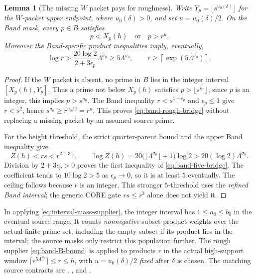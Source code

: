 \documentclass[11pt]{article}
\newcommand{\Lam}{\Lambda}
\newcommand{\epsp}{\epsilon_p}
\newtheorem{lemma}[theorem]{Lemma}
\theoremstyle{definition}
\theoremstyle{remark}
\newcommand{\1}{\mathbf 1}
\begin{document}
\begin{lemma}[The missing $W$ packet pays for roughness]
\label{lem:band-rough-transport}
Write $Y_p=\lfloor s^{u_0(\delta)}\rfloor$ for the $W$-packet upper endpoint,
where $u_0(\delta)>0$, and set $u=u_0(\delta)/2$.
On the Band mask, every $p\in B$ satisfies
\begin{equation}\label{eq:band-rough-bridge}
 p<X_p(h)\quad\text{or}\quad p>r^u.
\end{equation}
Moreover the Band-specific product inequalities imply, eventually,
\begin{equation}\label{eq:band-five-bridge}
 \log r>\frac{20\log2}{2+3\epsp}\Lam^{\sigma_0}
    \ge5\Lam^{\sigma_0},\qquad
 r\ge\left\lceil\exp(5\Lam^{\sigma_0})\right\rceil.
\end{equation}
\end{lemma}
\begin{proof}
If the $W$ packet is absent, no prime in $B$ lies in the integer
interval $[X_p(h),Y_p]$. Thus a prime not below $X_p(h)$ satisfies
$p>\lfloor s^{u_0}\rfloor$; since $p$ is an integer, this implies
$p>s^{u_0}$. The Band inequality $r<s^{1+\epsp}$ and
$\epsp\le1$ give $r<s^2$, hence
$s^{u_0}\ge r^{u_0/2}=r^u$. This proves
\eqref{eq:band-rough-bridge} without replacing a missing packet by
an assumed source prime.

For the height threshold, the strict quarter-parent bound and the
upper Band inequality give
\[
 Z(h)<rs<r^{2+3\epsp},\qquad
 \log Z(h)=20\bigl(\lfloor\Lam^{\sigma_0}\rfloor+1\bigr)\log2
    >20(\log2)\Lam^{\sigma_0}.
\]
Division by $2+3\epsp>0$ proves the first inequality of
\eqref{eq:band-five-bridge}. The coefficient tends to
$10\log2>5$ as $\epsp\to0$, so it is at least $5$ eventually.
The ceiling follows because $r$ is an integer. This stronger
$5$-threshold uses the \emph{refined Band interval}; the generic CORE
gate $rs\le r^3$ alone does not yield it.
\end{proof}

In applying \eqref{eq:interval-mass-supplier}, the integer interval
has $1\le a_0\le b_0$ in the eventual source range. It counts
\emph{nonnegative} subset-product weights over the actual finite prime
set, including the empty subset if its product lies in the interval;
the source masks only restrict this population further. The rough
supplier \eqref{eq:band-B-bound} is applied to products $r$ in the
actual high-support window
$\lceil e^{5\Lam^{\sigma_0}}\rceil\le r\le h$,
with $u=u_0(\delta)/2$ \emph{fixed} after $\delta$ is chosen.
The matching source contracts are
,
, and
.
\end{document}
